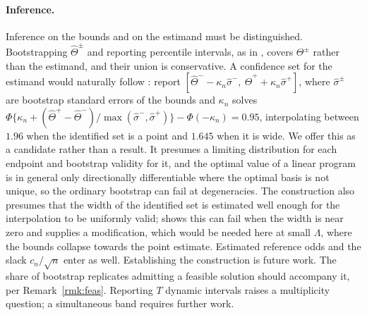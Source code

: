 \documentclass[12pt]{article}
\theoremstyle{remark}
\begin{document}
\paragraph{Inference.} Inference on the bounds and on the estimand must be distinguished.
Bootstrapping $\widehat\Theta^{\pm}$ and reporting percentile intervals, as in
\citet{tang2025simple}, covers $\Theta^{\pm}$ rather than the estimand, and their union is
conservative. A confidence set for the estimand would naturally follow
\citet{imbens2004confidence}: report
$[\widehat\Theta^- - \kappa_n\widehat\sigma^-,\ \widehat\Theta^+ + \kappa_n\widehat\sigma^+]$,
where $\widehat\sigma^{\pm}$ are bootstrap standard errors of the bounds and $\kappa_n$
solves
$\Phi\{\kappa_n + (\widehat\Theta^+ - \widehat\Theta^-)/\max(\widehat\sigma^-,\widehat\sigma^+)\}
 - \Phi(-\kappa_n) = 0.95$, interpolating between $1.96$ when the identified set is a point
and $1.645$ when it is wide. We offer this as a candidate rather than a result. It
presumes a limiting distribution for each endpoint and bootstrap validity for it, and the
optimal value of a linear program is in general only directionally differentiable where
the optimal basis is not unique, so the ordinary bootstrap can fail at degeneracies.
The construction also presumes that the width of the identified set is estimated well
enough for the interpolation to be uniformly valid; \citet{stoye2009more} shows this can
fail when the width is near zero and supplies a modification, which would be needed here
at small $\Lambda$, where the bounds collapse towards the point estimate. Estimated
reference odds and the slack $c_n/\sqrt{n}$ enter as well. Establishing the
construction is future work. The share of bootstrap replicates admitting a feasible
solution should accompany it, per Remark~\ref{rmk:feas}. Reporting $T$ dynamic intervals
raises a multiplicity question; a simultaneous band requires further work.
\end{document}
